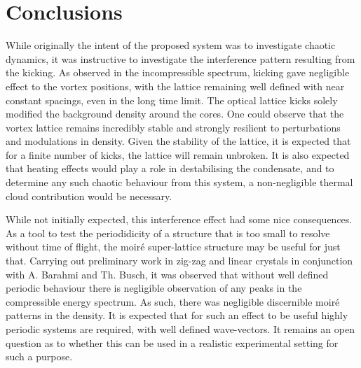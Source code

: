 \section{Conclusions}
\label{sec:ch5_conc}
While originally the intent of the proposed system was to investigate chaotic dynamics, it was instructive to investigate the interference pattern resulting from the kicking. As observed in the incompressible spectrum, kicking gave negligible effect to the vortex positions, with the lattice remaining well defined with near constant spacings, even in the long time limit. The optical lattice kicks solely modified the background density around the cores. One could observe that the vortex lattice remains incredibly stable and strongly resilient to perturbations and modulations in density. Given the stability of the lattice, it is expected that for a finite number of kicks, the lattice will remain unbroken. It is also expected that heating effects would play a role in destabilising the condensate, and to determine any such chaotic behaviour from this system, a non-negligible thermal cloud contribution would be necessary.

While not initially expected, this interference effect had some nice consequences. As a tool to test the periodidicity of a structure that is too small to resolve without time of flight, the moir\'e super-lattice structure may be useful for just that. Carrying out preliminary work in zig-zag and linear crystals in conjunction with A. Barahmi and Th. Busch, it was observed that without well defined periodic behaviour there is negligible observation of any peaks in the compressible energy spectrum. As such, there was negligible discernible moir\'e patterns in the density. It is expected that for such an effect to be useful highly periodic systems are required, with well defined wave-vectors. It remains an open question as to whether this can be used in a realistic experimental setting for such a purpose.
